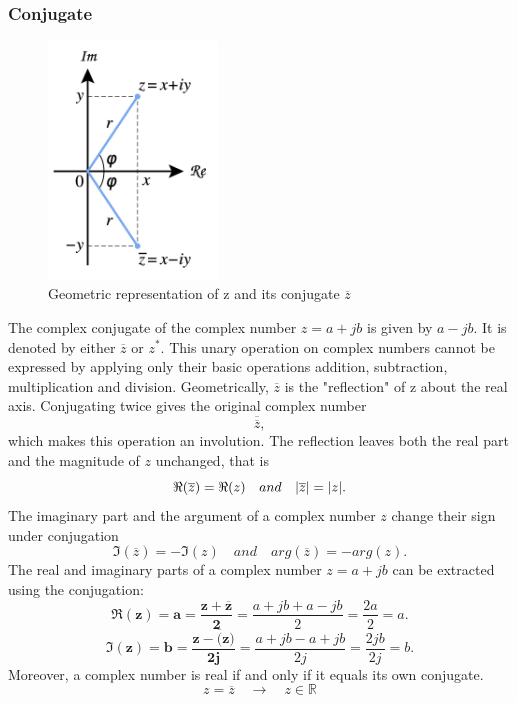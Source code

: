 \documentclass[12pt,oneside,openany]{memoir}
\numberwithin{equation}{subsection}
\DeclarePairedDelimiter{\abs}{\lvert}{\rvert}
\let\conjugate\overline
\begin{document}
\subsubsection{Conjugate}
\begin{figure}
	\centering
	\captionsetup{justification=centering}
	\includegraphics[width=0.4\textwidth]{images/complex_conjugate_picture.png}
	\caption{Geometric representation of z and its conjugate \(\conjugate{z}\)}
\end{figure}
The complex conjugate of the complex number \(z = a + jb\) is given by
\(a − jb\). It is denoted by either \(\conjugate{z}\) or \(z^*\). This unary
operation on complex numbers cannot be expressed by applying only their basic
operations addition, subtraction, multiplication and division.
\bigbreak
Geometrically, \(\conjugate{z}\) is the "reflection" of z about the real axis.
Conjugating twice gives the original complex number
\[
	\conjugate{\conjugate{z}},
\]
which makes this operation an involution. The reflection leaves both the real
part and the magnitude of \(z\) unchanged, that is
\[
	\Re(\conjugate{z}) = \Re(z) \quad and \quad \abs{\conjugate{z}} =
	\abs{z}.
\]
The imaginary part and the argument of a complex number \(z\) change their sign
under conjugation 
\[
	\Im(\conjugate{z}) = -\Im(z) \quad and \quad arg(\conjugate{z}) =
	-arg(z).
\]
\vspace{1.0cm}
\bigbreak
The real and imaginary parts of a complex number \(z = a + jb\) can be extracted
using the conjugation:
\[
	\boldsymbol{\Re(z) = a = \frac{z + \conjugate{z}}{2}} =
	\frac{a + jb + a - jb}{2} = \frac{2a}{2} = a.
\]
\[
	\boldsymbol{\Im(z) = b = \frac{z - \conjugate(z)}{2j}} =
	\frac{a + jb - a + jb}{2j} = \frac{2jb}{2j} = b.
\]
Moreover, a complex number is real if and only if it equals its own conjugate. 
\[
	z = \conjugate{z} \quad \rightarrow \quad z \in \mathbb{R}
\]
\end{document}
